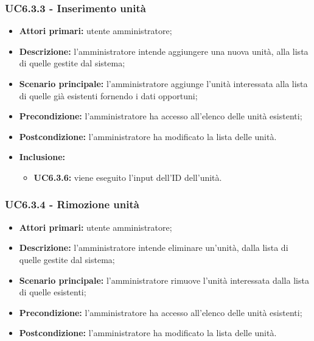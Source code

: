 \subsubsection{UC6.3.3 - Inserimento unità}
	\begin{itemize}
		\item \textbf{Attori primari:} utente amministratore;
		\item \textbf{Descrizione:} l'amministratore intende aggiungere una nuova unità, alla lista di quelle gestite dal sistema;
		\item \textbf{Scenario principale:} l'amministratore aggiunge l'unità interessata alla lista di quelle già esistenti fornendo i dati opportuni;
		\item \textbf{Precondizione:} l'amministratore ha accesso all'elenco delle unità esistenti;
		\item \textbf{Postcondizione:} l'amministratore ha modificato la lista delle unità.
		\item \textbf{Inclusione:} 
		\begin{itemize}
			\item \textbf{UC6.3.6:} viene eseguito l'input dell'ID dell'unità.
		\end{itemize}
	\end{itemize}

\subsubsection{UC6.3.4 - Rimozione unità}
	\begin{itemize}
		\item \textbf{Attori primari:} utente amministratore;
		\item \textbf{Descrizione:} l'amministratore intende eliminare un'unità, dalla lista di quelle gestite dal sistema;
		\item \textbf{Scenario principale:} l'amministratore rimuove l'unità interessata dalla lista di quelle esistenti;
		\item \textbf{Precondizione:} l'amministratore ha accesso all'elenco delle unità esistenti;
		\item \textbf{Postcondizione:} l'amministratore ha modificato la lista delle unità.
	\end{itemize}

